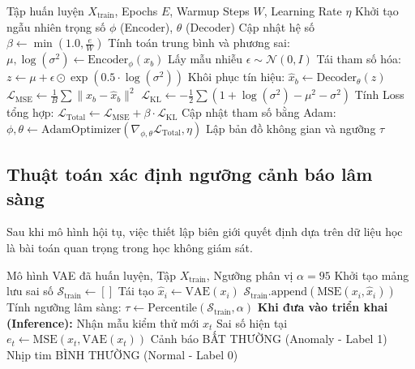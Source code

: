 \documentclass[conference]{IEEEtran}
\begin{document}
\begin{algorithm}[H]
\caption{Huấn luyện VAE với Beta-Warmup tuyến tính}
\begin{algorithmic}[1]
\REQUIRE Tập huấn luyện \(X_{\text{train}}\), Epochs \(E\), Warmup Steps \(W\), Learning Rate \(\eta\)
\STATE Khởi tạo ngẫu nhiên trọng số \(\phi\) (Encoder), \(\theta\) (Decoder)
    \STATE Cập nhật hệ số \(\beta \leftarrow \min\left(1.0, \frac{e}{W}\right)\)
        \STATE Tính toán trung bình và phương sai: \(\mu, \log(\sigma^2) \leftarrow \text{Encoder}_\phi(x_b)\)
        \STATE Lấy mẫu nhiễu \(\epsilon \sim \mathcal{N}(0, I)\)
        \STATE Tái tham số hóa: \(z \leftarrow \mu + \epsilon \odot \exp(0.5 \cdot \log(\sigma^2))\)
        \STATE Khôi phục tín hiệu: \(\hat{x}_b \leftarrow \text{Decoder}_\theta(z)\)
        \STATE \(\mathcal{L}_{\text{MSE}} \leftarrow \frac{1}{B} \sum \|x_b - \hat{x}_b\|^2\)
        \STATE \(\mathcal{L}_{\text{KL}} \leftarrow -\frac{1}{2} \sum \left(1 + \log(\sigma^2) - \mu^2 - \sigma^2\right)\)
        \STATE Tính Loss tổng hợp: \(\mathcal{L}_{\text{Total}} \leftarrow \mathcal{L}_{\text{MSE}} + \beta \cdot \mathcal{L}_{\text{KL}}\)
        \STATE Cập nhật tham số bằng Adam: \(\phi, \theta \leftarrow \text{AdamOptimizer}(\nabla_{\phi,\theta}\mathcal{L}_{\text{Total}}, \eta)\)
    \ENDFOR
\ENDFOR
\RETURN Lập bản đồ không gian và ngưỡng \(\tau\)
\end{algorithmic}
\end{algorithm}

\subsection{Thuật toán xác định ngưỡng cảnh báo lâm sàng}
Sau khi mô hình hội tụ, việc thiết lập biên giới quyết định dựa trên dữ liệu học là bài toán quan trọng trong học không giám sát.

\begin{algorithm}[H]
\caption{Quy trình suy luận và đánh giá ngưỡng}
\begin{algorithmic}[1]
\REQUIRE Mô hình VAE đã huấn luyện, Tập \(X_{\text{train}}\), Ngưỡng phân vị \(\alpha = 95\)
\STATE Khởi tạo mảng lưu sai số \(\mathcal{S}_{\text{train}} \leftarrow []\)
    \STATE Tái tạo \(\hat{x}_i \leftarrow \text{VAE}(x_i)\)
    \STATE \(\mathcal{S}_{\text{train}}\text{.append}(\text{MSE}(x_i, \hat{x}_i))\)
\ENDFOR
\STATE Tính ngưỡng lâm sàng: \(\tau \leftarrow \text{Percentile}(\mathcal{S}_{\text{train}}, \alpha)\)
\STATE \textbf{Khi đưa vào triển khai (Inference):}
\STATE Nhận mẫu kiểm thử mới \(x_t\)
\STATE Sai số hiện tại \(e_t \leftarrow \text{MSE}(x_t, \text{VAE}(x_t))\)
    \RETURN Cảnh báo BẤT THƯỜNG (Anomaly - Label 1)
\ELSE
    \RETURN Nhịp tim BÌNH THƯỜNG (Normal - Label 0)
\ENDIF
\end{algorithmic}
\end{algorithm}
\end{document}
